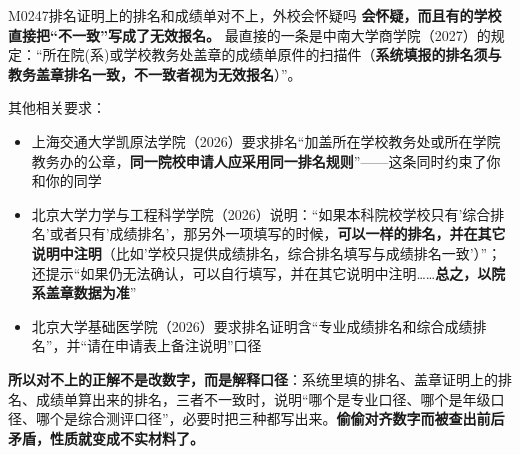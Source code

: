 \begin{qa}{M0247}{排名证明上的排名和成绩单对不上，外校会怀疑吗}
\textbf{会怀疑，而且有的学校直接把“不一致”写成了无效报名。} 最直接的一条是中南大学商学院（2027）的规定：“所在院(系)或学校教务处盖章的成绩单原件的扫描件（\textbf{系统填报的排名须与教务盖章排名一致，不一致者视为无效报名}）”。

其他相关要求：

\begin{itemize}
  \item 上海交通大学凯原法学院（2026）要求排名“加盖所在学校教务处或所在学院教务办的公章，\textbf{同一院校申请人应采用同一排名规则}”——这条同时约束了你和你的同学
  \item 北京大学力学与工程科学学院（2026）说明：“如果本科院校学校只有'综合排名'或者只有'成绩排名'，那另外一项填写的时候，\textbf{可以一样的排名，并在其它说明中注明}（比如'学校只提供成绩排名，综合排名填写与成绩排名一致'）”；还提示“如果仍无法确认，可以自行填写，并在其它说明中注明……\textbf{总之，以院系盖章数据为准}”
  \item 北京大学基础医学院（2026）要求排名证明含“专业成绩排名和综合成绩排名”，并“请在申请表上备注说明”口径
\end{itemize}

\textbf{所以对不上的正解不是改数字，而是解释口径}：系统里填的排名、盖章证明上的排名、成绩单算出来的排名，三者不一致时，说明“哪个是专业口径、哪个是年级口径、哪个是综合测评口径”，必要时把三种都写出来。\textbf{偷偷对齐数字而被查出前后矛盾，性质就变成不实材料了。}
\end{qa}

